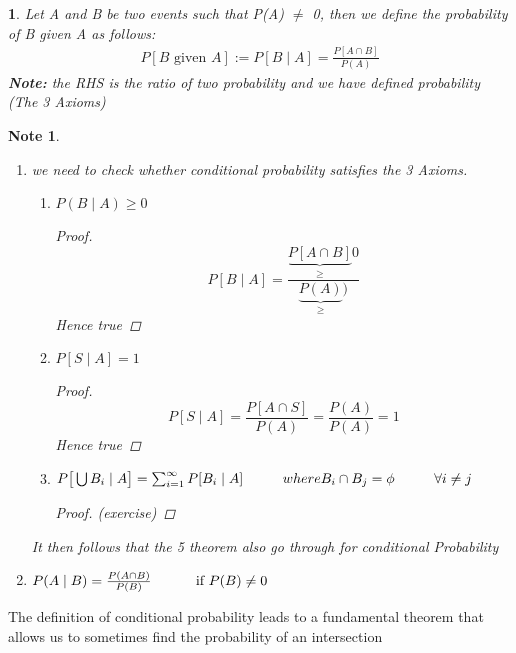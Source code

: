 \documentclass[11pt]{article}
\newtheorem*{note}{Note}
\newtheorem{definition}{\framebox{DEF}}[section]
\newcommand\tab[1][1cm]{\hspace*{#1}}
\begin{document}
                \begin{definition}
                    Let A and B be two events such that P(A) $\neq $ 0, then we define the probability of B given A as follows:
                    \begin{align*}
                        P[B \text{ given } A] := P[B \mid A] = \frac{P[A\cap B]}{P(A)}
                    \end{align*}
                    \textbf{\textit{Note: }}the RHS is the ratio of two probability and we have defined probability (The 3 Axioms)
                \end{definition}
                \begin{note} \tab 
                    \begin{enumerate}
                        \item we need to check whether conditional probability satisfies the 3 Axioms.
                            \begin{enumerate}
                                \item $P(B \mid A) \geq 0$ 
                                    \begin{proof}
                                        \[P[ B \mid A] = \frac{\underbrace{P[A \cap B]}_\geq 0}{\underbrace{P(A)}_\geq )}\]
                                        Hence true
                                    \end{proof}
                                \item $P[S \mid A ] =1 $
                                    \begin{proof}
                                        \[P[ S \mid A] = \frac{P[A \cap S]}{P(A)} = \frac{P(A)}{P(A)} = 1\]
                                        Hence true
                                    \end{proof}
                                \item $P\big[\bigcup B_i \mid A \big] = \sum_{i=1}^{\infty} P[B_i \mid A] \tab where B_i \cap B_j = \phi \tab \forall i \neq j$
                                    \begin{proof}
                                        (exercise)
                                    \end{proof}
                            \end{enumerate}
                        It then follows that the 5 theorem also go through for conditional Probability
                        \item $P(A \mid B) = \frac{P(A \cap B)}{P(B)} \tab \text{ if } P(B) \neq 0$
                            
                    \end{enumerate}
                \end{note}
                The definition of conditional probability leads to a fundamental theorem that allows us to sometimes
                find the probability of an intersection 
\end{document}
